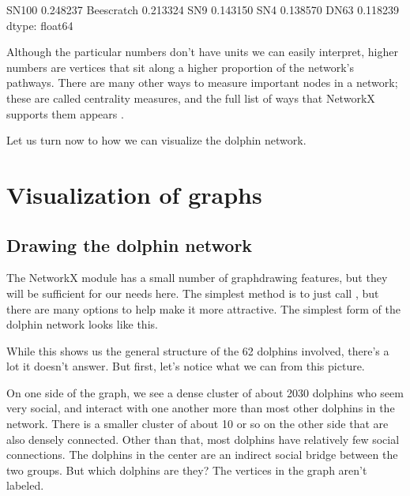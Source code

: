 \documentclass[letterpaper,10pt,english]{sphinxmanual}
\begin{document}
\begin{sphinxVerbatim}[commandchars=\\\{\}]
SN100         0.248237
Beescratch    0.213324
SN9           0.143150
SN4           0.138570
DN63          0.118239
dtype: float64
\end{sphinxVerbatim}

Although the particular numbers don’t have units we can easily interpret, higher numbers are vertices that sit along a higher proportion of the network’s pathways.  There are many other ways to measure important nodes in a network; these are called centrality measures, and the full list of ways that NetworkX supports them appears .

Let us turn now to how we can visualize the dolphin network.


\section{Visualization of graphs}
\label{\detokenize{chapter-15-networks:visualization-of-graphs}}

\subsection{Drawing the dolphin network}
\label{\detokenize{chapter-15-networks:drawing-the-dolphin-network}}
The NetworkX module has a small number of graph\sphinxhyphen{}drawing features, but they will be sufficient for our needs here.  The simplest method is to just call , but there are many options to help make it more attractive.  The simplest form of the dolphin network looks like this.

\begin{sphinxVerbatim}[commandchars=\\\{\}]
  
\end{sphinxVerbatim}

\noindent{}

While this shows us the general structure of the 62 dolphins involved, there’s a lot it doesn’t answer.  But first, let’s notice what we can from this picture.

On one side of the graph, we see a dense cluster of about 20\sphinxhyphen{}30 dolphins who seem very social, and interact with one another more than most other dolphins in the network.  There is a smaller cluster of about 10 or so on the other side that are also densely connected.  Other than that, most dolphins have relatively few social connections.  The dolphins in the center are an indirect social bridge between the two groups.  But which dolphins are they?  The vertices in the graph aren’t labeled.
\end{document}
